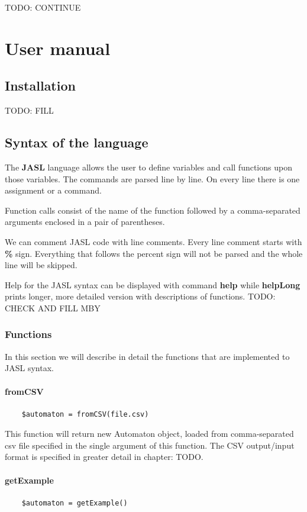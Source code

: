 \documentclass{ctuthesis}
\begin{document}
TODO: CONTINUE

\chapter{User manual}
\section{Installation}
TODO: FILL

\section{Syntax of the language}
The \textbf{JASL} language allows the user to define variables and call functions upon those variables. The commands are parsed line by line. On every line there is one assignment or a command. 

Function calls consist of the name of the function followed by a comma-separated arguments enclosed in a pair of parentheses.

We can comment JASL code with line comments. Every line comment starts with \textbf{\%} sign. Everything that follows the percent sign will not be parsed and the whole line will be skipped. 

Help for the JASL syntax can be displayed with command \textbf{help} while \textbf{helpLong} prints longer, more detailed version with descriptions of functions. 
TODO: CHECK AND FILL MBY

\subsection{Functions}
In this section we will describe in detail the functions that are implemented to JASL syntax.

\subsubsection{fromCSV}
\begin{verbatim}
	$automaton = fromCSV(file.csv)
\end{verbatim}

This function will return new Automaton object, loaded from comma-separated csv file specified in the single argument of this function. The CSV output/input format is specified in greater detail in chapter: TODO.

\subsubsection{getExample}
\begin{verbatim}
	$automaton = getExample()
\end{verbatim}
\end{document}
